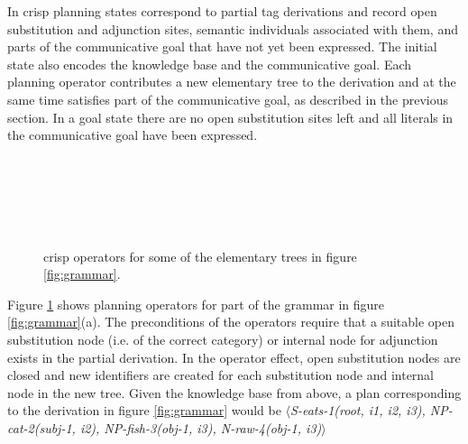 In {\sc crisp} planning states correspond to partial {\sc tag} derivations and record open substitution and adjunction sites, semantic individuals associated with them, and parts of the communicative goal that have not yet been expressed.  The initial state also encodes the knowledge base and the communicative goal. Each planning operator contributes a new elementary tree to the derivation and at the same time satisfies part of the communicative goal, as described in the previous section. In a goal state there are no open substitution sites left and all literals in the communicative goal have been expressed. 
\begin{figure}[t]
\begin{center}
\\\smallskip

\\ \smallskip


\\\smallskip
\end{center}
\caption{\label{fig:crisp-operators} {\sc crisp} operators for some of the elementary trees in figure \ref{fig:grammar}.}
\end{figure}


Figure \ref{fig:crisp-operators} shows planning operators for part of the grammar in figure \ref{fig:grammar}(a).
The preconditions of the operators require that a suitable open substitution node (i.e. of the correct category) or internal node for adjunction exists in the partial derivation. In the operator effect, open substitution nodes are closed and new identifiers are created for each substitution node and internal node in the new tree. Given the knowledge base from above, a plan corresponding to the derivation in figure \ref{fig:grammar} would be $\langle${\it S-eats-1(root, i1, i2, i3), NP-cat-2(subj-1, i2), NP-fish-3(obj-1, i3), N-raw-4(obj-1, i3)}$\rangle$

